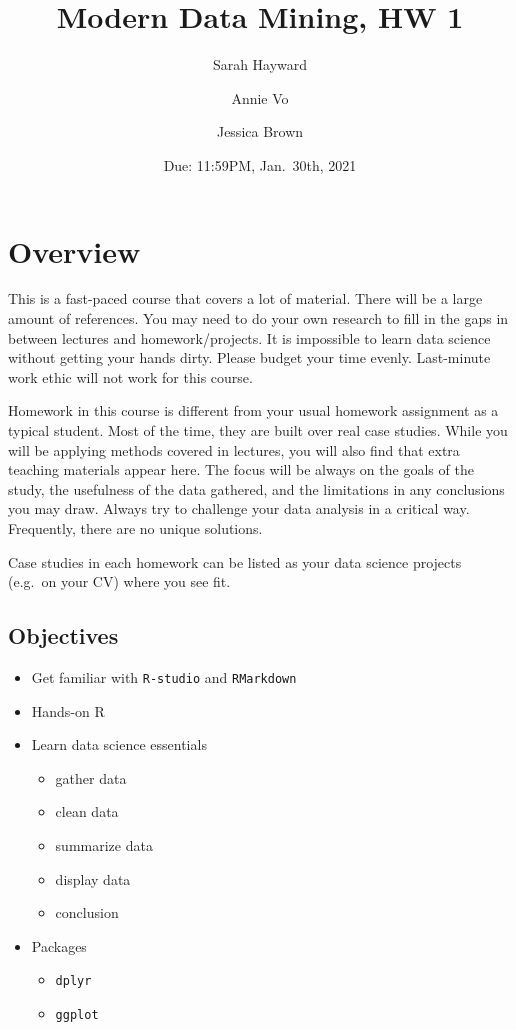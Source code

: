 \documentclass[
]{article}
\title{Modern Data Mining, HW 1}
\author{Sarah Hayward \and Annie Vo \and Jessica Brown}
\date{Due: 11:59PM, Jan.~30th, 2021}
\providecommand{\tightlist}{%
  \setlength{\itemsep}{0pt}\setlength{\parskip}{0pt}}
\begin{document}
\maketitle

{
\hypersetup{linkcolor=}
\setcounter{tocdepth}{4}
\tableofcontents
}
\pagebreak

\hypertarget{overview}{%
\section{Overview}\label{overview}}

This is a fast-paced course that covers a lot of material. There will be
a large amount of references. You may need to do your own research to
fill in the gaps in between lectures and homework/projects. It is
impossible to learn data science without getting your hands dirty.
Please budget your time evenly. Last-minute work ethic will not work for
this course.

Homework in this course is different from your usual homework assignment
as a typical student. Most of the time, they are built over real case
studies. While you will be applying methods covered in lectures, you
will also find that extra teaching materials appear here. The focus will
be always on the goals of the study, the usefulness of the data
gathered, and the limitations in any conclusions you may draw. Always
try to challenge your data analysis in a critical way. Frequently, there
are no unique solutions.

Case studies in each homework can be listed as your data science
projects (e.g.~on your CV) where you see fit.

\hypertarget{objectives}{%
\subsection{Objectives}\label{objectives}}

\begin{itemize}
\tightlist
\item
  Get familiar with \texttt{R-studio} and \texttt{RMarkdown}
\item
  Hands-on R
\item
  Learn data science essentials

  \begin{itemize}
  \tightlist
  \item
    gather data
  \item
    clean data
  \item
    summarize data
  \item
    display data
  \item
    conclusion
  \end{itemize}
\item
  Packages

  \begin{itemize}
  \tightlist
  \item
    \texttt{dplyr}
  \item
    \texttt{ggplot}
  \end{itemize}
\end{itemize}
\end{document}
